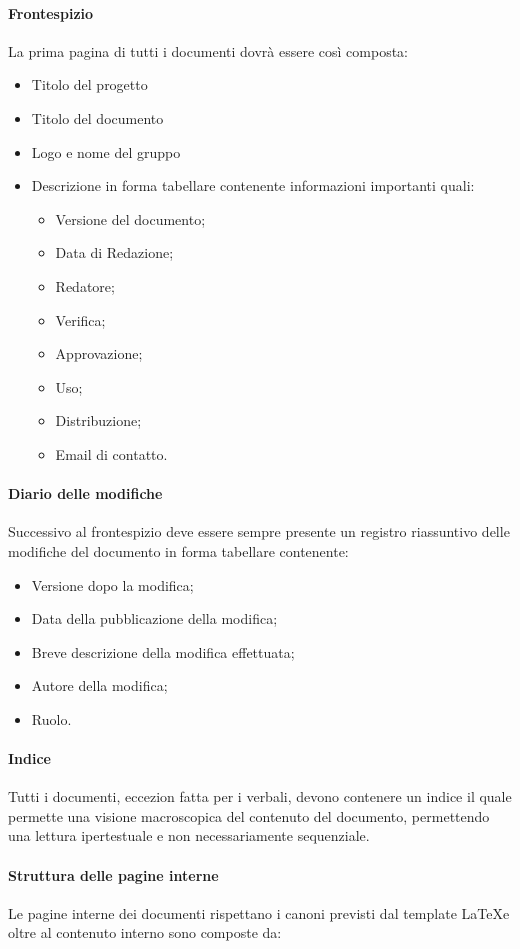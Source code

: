 \paragraph{Frontespizio}
La prima pagina di tutti i documenti dovrà essere così composta:
\begin{itemize}
	\item Titolo del progetto
	\item Titolo del documento
	\item Logo e nome del gruppo
	\item Descrizione in forma tabellare contenente informazioni importanti quali:
	\begin{itemize}
		\item Versione del documento;
		\item Data di Redazione;
		\item Redatore;
		\item Verifica;
		\item Approvazione;
		\item Uso;
		\item Distribuzione;
		\item Email di contatto.
	\end{itemize}
\end{itemize}

\paragraph{Diario delle modifiche}
Successivo al frontespizio deve essere sempre presente un registro riassuntivo delle modifiche del documento in forma tabellare contenente:
\begin{itemize}
\item Versione dopo la modifica;
\item Data della pubblicazione della modifica;
\item Breve descrizione della modifica effettuata;
\item Autore della modifica;
\item Ruolo.
\end{itemize}
\paragraph{Indice}
Tutti i documenti, eccezion fatta per i verbali, devono contenere un indice il quale permette una visione macroscopica del contenuto del documento,
permettendo una lettura ipertestuale e non necessariamente sequenziale.
\paragraph{Struttura delle pagine interne}
Le pagine interne dei documenti rispettano i canoni previsti dal template \LaTeX e oltre al contenuto interno sono composte da: \\

